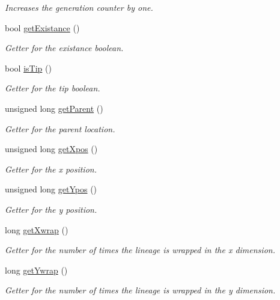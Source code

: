 \begin{DoxyCompactItemize}
\begin{DoxyCompactList}\small\item\em Increases the generation counter by one. \end{DoxyCompactList}\item 
bool \hyperlink{class_treenode_ace87274d2796a77256dbce935e2375b2}{get\+Existance} ()
\begin{DoxyCompactList}\small\item\em Getter for the existance boolean. \end{DoxyCompactList}\item 
bool \hyperlink{class_treenode_a4f965feba2b2ba0ac4dd5bec0d54e684}{is\+Tip} ()
\begin{DoxyCompactList}\small\item\em Getter for the tip boolean. \end{DoxyCompactList}\item 
unsigned long \hyperlink{class_treenode_a64ec6d0d909b1e34dac2428872e8b06e}{get\+Parent} ()
\begin{DoxyCompactList}\small\item\em Getter for the parent location. \end{DoxyCompactList}\item 
unsigned long \hyperlink{class_treenode_a21e176b5d030751de95c6e8f9d1aea98}{get\+Xpos} ()
\begin{DoxyCompactList}\small\item\em Getter for the x position. \end{DoxyCompactList}\item 
unsigned long \hyperlink{class_treenode_a97e64a35740dbea2ef2dc0069cef2b8e}{get\+Ypos} ()
\begin{DoxyCompactList}\small\item\em Getter for the y position. \end{DoxyCompactList}\item 
long \hyperlink{class_treenode_a949741ee546b263eae8265e27ad74df4}{get\+Xwrap} ()
\begin{DoxyCompactList}\small\item\em Getter for the number of times the lineage is wrapped in the x dimension. \end{DoxyCompactList}\item 
long \hyperlink{class_treenode_a62be6c15c2378148c8c85b4f4d3b7f78}{get\+Ywrap} ()
\begin{DoxyCompactList}\small\item\em Getter for the number of times the lineage is wrapped in the y dimension. \end{DoxyCompactList}\item 

\end{DoxyCompactItemize}

